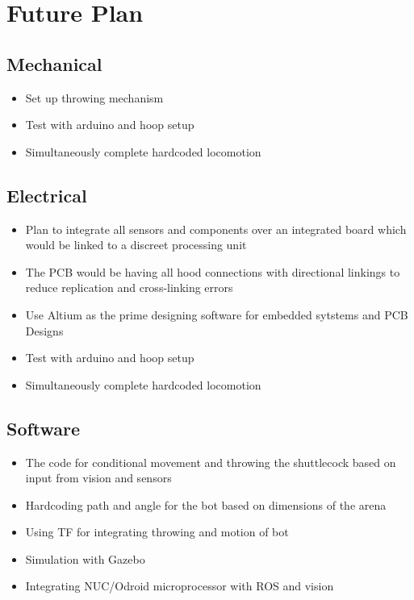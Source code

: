 \documentclass[11pt]{article}
\begin{document}
\pagebreak

\section{Future Plan}
\subsection{Mechanical}
\begin{itemize}
\item{Set up throwing mechanism}
\item{Test with arduino and hoop setup}
\item{Simultaneously complete hardcoded locomotion}
\end{itemize}

\subsection{Electrical}
\begin{itemize}
\item{Plan to integrate all sensors and components over an integrated board which would be linked to a discreet processing unit}
\item{The PCB would be having all hood connections with directional linkings to reduce replication and cross-linking errors}
\item{Use Altium as the prime designing software for embedded sytstems and PCB Designs}
\item{Test with arduino and hoop setup}
\item{Simultaneously complete hardcoded locomotion}
\end{itemize}
\subsection{Software}
\begin{itemize}
\item{The code for conditional movement and throwing the shuttlecock based on input from vision and sensors}
\item{Hardcoding path and angle for the bot based on dimensions of the arena}
\item{Using TF for integrating throwing and motion of bot}
\item{Simulation with Gazebo}
\item{Integrating NUC/Odroid microprocessor with ROS and vision}
\end{itemize}
\end{document}

